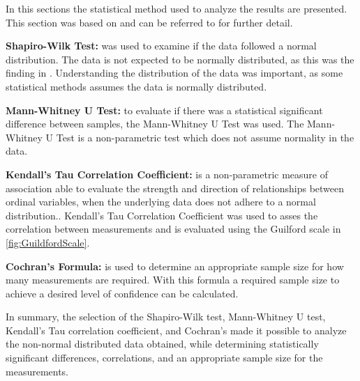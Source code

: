 

In this sections the statistical method used to analyze the results are presented. This section was based on \cite{biksbois} and can be referred to for further detail.\newline %


\noindent\textbf{Shapiro-Wilk Test:} was used to examine if the data followed a normal distribution. %
The data is not expected to be normally distributed, as this was the finding in \cite{biksbois}. Understanding the distribution of the data was important, as some statistical methods assumes the data is normally distributed.\cite{razali2011power}\newline

\noindent\textbf{Mann-Whitney U Test:}
to evaluate if there was a statistical significant difference between samples, the Mann-Whitney U Test was used. The Mann-Whitney U Test is a non-parametric test which does not assume normality in the data.\cite{mann1947test}\newline


\noindent\textbf{Kendall's Tau Correlation Coefficient:} is a non-parametric measure of association able to evaluate the strength and direction of relationships between ordinal variables, when the underlying data does not adhere to a normal distribution.\cite{han1987non}. Kendall's Tau Correlation Coefficient was used to asses the correlation between measurements and is evaluated using the Guilford scale in \cref{fig:GuildfordScale}.\cite[219]{guilford1950fundamental}\newline



\noindent\textbf{Cochran's Formula:}
is used to determine an appropriate sample size for how many measurements are required. With this formula a required sample size to achieve a desired level of confidence can be calculated.\cite{Cochran}\newline

\noindent In summary, the selection of the Shapiro-Wilk test, Mann-Whitney U test, Kendall's Tau correlation coefficient, and Cochran's made it possible to analyze the non-normal distributed data obtained, while determining statistically significant differences, correlations, and an appropriate sample size for the measurements.
